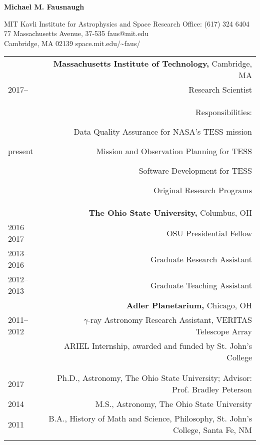 \documentclass[letterpaper,10pt]{article}
\begin{document}
\begin{center}
\huge\bfseries{Michael M. Fausnaugh}
\end{center}

\noindent MIT Kavli Institute for Astrophysics and Space Research \hfill Office: (617) 324 6404 \\
77 Massachusetts Avenue, 37-535  \hfill faus@mit.edu\\
Cambridge, MA 02139 \hfill space.mit.edu/\textasciitilde faus/

%

\begin{longtable}{LR}

  \underline{} 
  &\textbf{Massachusetts Institute of Technology,} Cambridge, MA\\
  2017-- & Research Scientist \\
  present &Responsibilities: \begin{compactitem}
   \item Data Quality Assurance for NASA's TESS mission
   \item Mission and Observation Planning for TESS
   \item Software Development for TESS
   \item Original Research Programs
   \end{compactitem}	
   \\

  &\textbf{The Ohio State University,} Columbus, OH\\
  2016--2017 & OSU Presidential Fellow\\
  2013--2016 & Graduate Research Assistant \\
  2012--2013 & Graduate Teaching Assistant \\
  &\textbf{Adler Planetarium,} Chicago, OH\\
  2011--2012 & $\gamma$-ray Astronomy Research Assistant, VERITAS Telescope Array\\
  &  ARIEL Internship, awarded and funded by St. John's College \\
  \\
  
\underline{} &     \\
2017   &    Ph.D., Astronomy, The Ohio State University;  Advisor:  Prof. Bradley Peterson\\
2014 &    M.S.,  Astronomy, The Ohio State University\\
2011&B.A., History of Math and Science, Philosophy, St. John's College, Santa Fe, NM\\
\\


\end{longtable}
\end{document}
